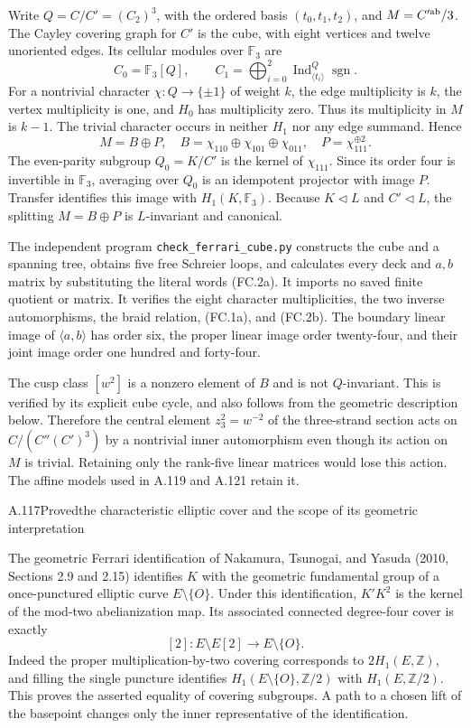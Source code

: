 Write $Q=C/C'=(C_2)^3$, with the ordered basis $(t_0,t_1,t_2)$,
and $M=C'^{\rm ab}/3$. The Cayley covering graph for $C'$
is the cube, with eight vertices and twelve unoriented edges.
Its cellular modules over $\mathbb F_3$ are
\[
 C_0=\mathbb F_3[Q],\qquad
 C_1=\bigoplus_{i=0}^2
    \operatorname{Ind}_{\langle t_i\rangle}^{Q}\operatorname{sgn}.
\]
For a nontrivial character $\chi:Q\to\{\pm1\}$ of weight
$k$, the edge multiplicity is $k$, the vertex multiplicity is one,
and $H_0$ has multiplicity zero. Thus its multiplicity in $M$
is $k-1$. The trivial character occurs in neither $H_1$ nor any
edge summand. Hence
\[
 M=B\oplus P,\quad
 B=\chi_{110}\oplus\chi_{101}\oplus\chi_{011},\quad
 P=\chi_{111}^{\oplus2}.
 \tag{FC.2c}
\]
The even-parity subgroup $Q_0=K/C'$ is the kernel of
$\chi_{111}$. Since its order four is invertible in
$\mathbb F_3$, averaging over $Q_0$ is an idempotent projector
with image $P$. Transfer identifies this image with
$H_1(K,\mathbb F_3)$. Because $K\triangleleft L$ and
$C'\triangleleft L$, the splitting $M=B\oplus P$ is
$L$-invariant and canonical.

The independent program \texttt{check\_ferrari\_cube.py}
constructs the cube and a spanning tree, obtains five free
Schreier loops, and calculates every deck and $a,b$ matrix by
substituting the literal words (FC.2a). It imports no saved finite
quotient or matrix. It verifies the eight character multiplicities,
the two inverse automorphisms, the braid relation, (FC.1a), and
(FC.2b). The boundary linear image of $\langle a,b\rangle$
has order six, the proper linear image order twenty-four, and
their joint image order one hundred and forty-four.

The cusp class $[w^2]$ is a nonzero element of $B$ and is not
$Q$-invariant. This is verified by its explicit cube cycle, and
also follows from the geometric description below. Therefore the
central element $z_3^2=w^{-2}$ of the three-strand section acts
on $C/(C''(C')^3)$ by a nontrivial inner automorphism even though
its action on $M$ is trivial. Retaining only the rank-five linear
matrices would lose this action. The affine models used in A.119
and A.121 retain it.

\begin{statement}{A.117}{Proved}{the characteristic elliptic cover and the scope of its geometric interpretation}
\citep[Sections 2.9 and 2.15]{LitNakamuraTsunogaiYasuda2010}
\end{statement}
The geometric Ferrari identification of Nakamura, Tsunogai, and
Yasuda (2010, Sections 2.9 and 2.15) identifies $K$ with the
geometric fundamental group of a once-punctured elliptic curve
$E\setminus\{O\}$. Under this identification, $K'K^2$ is the
kernel of the mod-two abelianization map. Its associated connected
degree-four cover is exactly
\[
       [2]:E\setminus E[2]\longrightarrow E\setminus\{O\}.
 \tag{FC.3a}
\]
Indeed the proper multiplication-by-two covering corresponds to
$2H_1(E,\mathbb Z)$, and filling the single puncture identifies
$H_1(E\setminus\{O\},\mathbb Z/2)$ with
$H_1(E,\mathbb Z/2)$. This proves the asserted equality of covering
subgroups. A path to a chosen lift of the basepoint changes only
the inner representative of the identification.

